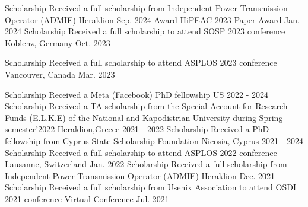
\begin{cvhonors}
	\cvhonor
	{Scholarship} %
	{Received a full scholarship from Independent Power Transmission
		Operator (ADMIE)} %
	{Heraklion} %
	{Sep. 2024} %
	\cvhonor
	{Award} %
	{HiPEAC 2023 Paper Award} %
	{} %
	{Jan. 2024} %
	\cvhonor
	{Scholarship} %
	{Received a full scholarship to attend SOSP 2023 conference} %
	{Koblenz, Germany} %
	{Oct. 2023} %

	\cvhonor
	{Scholarship} %
	{Received a full scholarship to attend ASPLOS 2023 conference} %
	{Vancouver, Canada} %
	{Mar. 2023} %

	\cvhonor
	{Scholarship} %
	{Received a Meta (Facebook) PhD fellowship} %
	{US} %
	{2022 - 2024} %
	\cvhonor
	{Scholarship} %
	{Received a TA scholarship from the Special Account for Research Funds (E.L.K.E) of the National and Kapodistrian University during Spring semester’2022} %
	{Heraklion,Greece} %
	{2021 - 2022} %
	\cvhonor
	{Scholarship} %
	{Received a PhD fellowship from Cyprus State Scholarship Foundation} %
	{Nicosia, Cyprus} %
	{2021 - 2024} %
	\cvhonor
	{Scholarship} %
	{Received a full scholarship to attend ASPLOS 2022 conference} %
	{Lausanne, Switzerland} %
	{Jan. 2022} %
	\cvhonor
	{Scholarship} %
	{Received a full scholarship from Independent Power Transmission
		Operator (ADMIE)} %
	{Heraklion} %
	{Dec. 2021} %
	\cvhonor
	{Scholarship} %
	{Received a full scholarship from Usenix Association to attend
		OSDI 2021 conference} %
	{Virtual Conference} %
	{Jul. 2021} %


\end{cvhonors}
